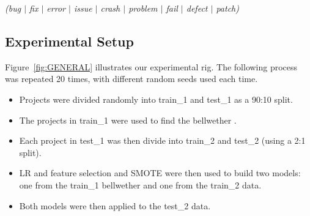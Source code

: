 \documentclass[10pt,journal,compsoc]{IEEEtran}
\newcommand{\fig}[1]{Figure~\ref{fig:#1}}
\newcommand{\bi}{\begin{itemize}}
\newcommand{\ei}{\end{itemize}}
\begin{document}
\begin{center}
\textit{(bug $\mid$ fix $\mid$ error $\mid$ issue $\mid$ crash $\mid$ problem $\mid$ fail $\mid$ defect $\mid$ patch)}
\end{center}
 




\subsection{Experimental Setup}
\label{sec:Experimental}


\fig{GENERAL} illustrates our experimental rig. 
 The following process was repeated 20 times, with different random seeds used each time.
 \bi
 \item
 Projects were divided
 randomly into train\_1 and test\_1 as a 90:10 split.
 \item
 The projects in train\_1 were used to find the bellwether .
 \item
 Each   project in test\_1 was  then divide into train\_2 and test\_2 (using a 2:1 split).
 \item
 LR and feature selection and SMOTE were then used
 to build two models: one from the train\_1 bellwether and one from the train\_2
 data.
 \item
 Both models were then applied to the test\_2 data.
 \ei
 






\end{document}
